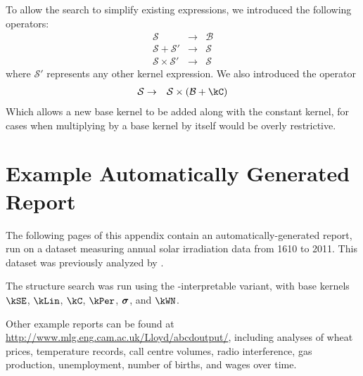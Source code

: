 To allow the search to simplify existing expressions, we introduced the following operators:
%
\begin{eqnarray}
\mathcal{S} &\to& \mathcal{B}\\
\mathcal{S} + \mathcal{S'} &\to& \mathcal{S}\\
\mathcal{S} \times \mathcal{S'} &\to& \mathcal{S}
\end{eqnarray}
%
where $\mathcal{S'}$ represents any other kernel expression.
We also introduced the operator
%
\begin{eqnarray}
\mathcal{S} &\to& \mathcal{S} \times (\mathcal{B} + \kC)
\end{eqnarray}
%
Which allows a new base kernel to be added along with the constant kernel, for cases when multiplying by a base kernel by itself would be overly restrictive.





\chapter{Example Automatically Generated Report}
\label{ch:example-solar}

The following pages of this appendix contain an automatically-generated report, run on a dataset measuring annual solar irradiation data from 1610 to 2011.
This dataset was previously analyzed by \citet{lean1995reconstruction}.

The structure search was run using the \procedurename-interpretable variant, with base kernels $\kSE$, $\kLin$, $\kC$, $\kPer$, ${\boldsymbol{\sigma}}$, and $\kWN$.

Other example reports can be found at \url{http://www.mlg.eng.cam.ac.uk/Lloyd/abcdoutput/}, including analyses of wheat prices, temperature records, call centre volumes, radio interference, gas production, unemployment, number of births, and wages over time.

\newcommand{\solarreportpage}[1]{\texttt{[image: figures/solarpages/02-solar-seperate-pages-\#1]}}

\clearpage


